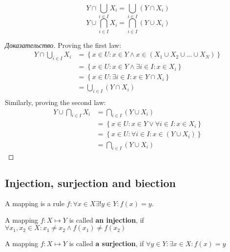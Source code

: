 \begin{proposition}[Distribution]
	\[
		Y \cap \bigcup_{i \in I} X_{i} = \bigcup_{i \in  I} \left( Y \cap X_i \right)  
	\] \[
		Y \cup \bigcap_{i \in  I} X_i = \bigcap_{i \in  I} \left( Y \cup X_i \right) 
	\]	
\end{proposition}


\begin{proof}[Доказательство]
	Proving the first law: 
	\begin{align*}
		Y \cap \bigcup_{i \in I} X_{i} &= \left\{x \in U: x \in Y \wedge x \in (X_1 \cup X_2 \cup \dots \cup X_N)  \right \} \\
		&= \left\{ x \in U: x \in Y \wedge \exists i \in I: x \in X_i \right \} \\
		&= \left\{ x \in U: \exists i \in I: x \in Y \cap X_i \right \}  \\
		&= \bigcup_{i \in  I} \left( Y \cap X_i \right)   \\
	\end{align*}
	Similarly, proving the second law:
	\begin{align*}
		Y \cup \bigcap_{i \in  I} X_i &= \bigcap_{i \in  I} \left( Y \cup X_i \right) \\
		&= \left\{ x \in U: x \in Y \vee \forall i \in I: x \in X_i \right \} \\
		&= \left\{ x \in U: \forall i \in I: x \in \left( Y \cup X_i \right)  \right \}  \\	
		&= \bigcap_{i \in  I} \left( Y \cup X_i \right)  
	\end{align*}
\end{proof}

\subsection{Injection, surjection and biection}

\begin{definition}[mapping]
	A mapping is a rule $f: \forall x \in X \exists! y \in Y: f(x) = y$.
\end{definition}

\begin{definition}[injection]
	A mapping $f: X \mapsto Y$ is called \textbf{an injection}, if $\forall x_1, x_2 \in X: x_1 \neq x_2 \wedge f(x_1) \neq f(x_2)$
\end{definition}

\begin{definition}[surjection]
	A mapping $f: X \mapsto Y$ is called \textbf{a surjection}, if $\forall y \in Y: \exists x \in X: f(x) = y$
\end{definition}

